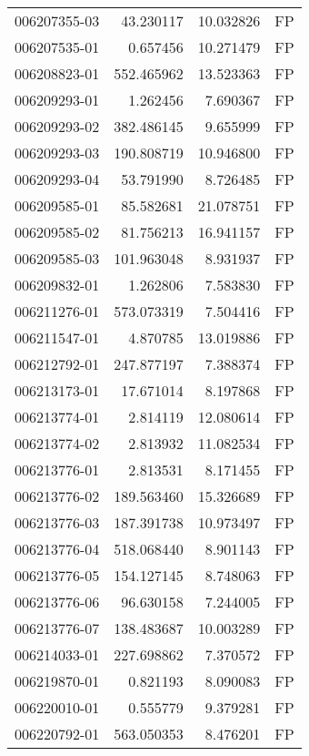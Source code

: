 \begin{tabular}{lrrl}
006207355-03 &   43.230117 &      10.032826 &   FP \\
006207535-01 &    0.657456 &      10.271479 &   FP \\
006208823-01 &  552.465962 &      13.523363 &   FP \\
006209293-01 &    1.262456 &       7.690367 &   FP \\
006209293-02 &  382.486145 &       9.655999 &   FP \\
006209293-03 &  190.808719 &      10.946800 &   FP \\
006209293-04 &   53.791990 &       8.726485 &   FP \\
006209585-01 &   85.582681 &      21.078751 &   FP \\
006209585-02 &   81.756213 &      16.941157 &   FP \\
006209585-03 &  101.963048 &       8.931937 &   FP \\
006209832-01 &    1.262806 &       7.583830 &   FP \\
006211276-01 &  573.073319 &       7.504416 &   FP \\
006211547-01 &    4.870785 &      13.019886 &   FP \\
006212792-01 &  247.877197 &       7.388374 &   FP \\
006213173-01 &   17.671014 &       8.197868 &   FP \\
006213774-01 &    2.814119 &      12.080614 &   FP \\
006213774-02 &    2.813932 &      11.082534 &   FP \\
006213776-01 &    2.813531 &       8.171455 &   FP \\
006213776-02 &  189.563460 &      15.326689 &   FP \\
006213776-03 &  187.391738 &      10.973497 &   FP \\
006213776-04 &  518.068440 &       8.901143 &   FP \\
006213776-05 &  154.127145 &       8.748063 &   FP \\
006213776-06 &   96.630158 &       7.244005 &   FP \\
006213776-07 &  138.483687 &      10.003289 &   FP \\
006214033-01 &  227.698862 &       7.370572 &   FP \\
006219870-01 &    0.821193 &       8.090083 &   FP \\
006220010-01 &    0.555779 &       9.379281 &   FP \\
006220792-01 &  563.050353 &       8.476201 &   FP \\

\end{tabular}
